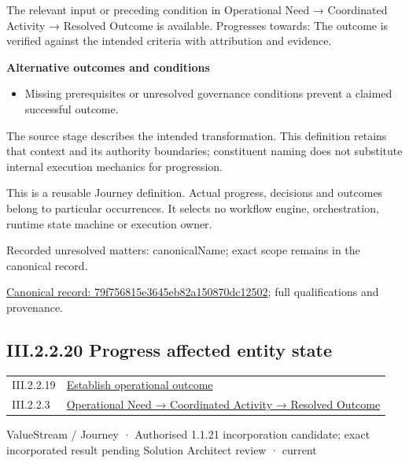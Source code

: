 The relevant input or preceding condition in Operational Need → Coordinated Activity → Resolved Outcome is available. Progresses towards: The outcome is verified against the intended criteria with attribution and evidence.



\par\medskip\textbf{Alternative outcomes and conditions}\par


\begin{itemize}


\item Missing prerequisites or unresolved governance conditions prevent a claimed successful outcome.

\end{itemize}


The source stage describes the intended transformation. This definition retains that context and its authority boundaries; constituent naming does not substitute internal execution mechanics for progression.



This is a reusable Journey definition. Actual progress, decisions and outcomes belong to particular occurrences. It selects no workflow engine, orchestration, runtime state machine or execution owner.


{\small Recorded unresolved matters: canonicalName; exact scope remains in the canonical record.}\par
{\footnotesize \href{../../../../../../../continuum/strategy/value-stream/79f756815e3645eb82a150870dc12502.md}{Canonical record: 79f756815e3645eb82a150870dc12502}; full qualifications and provenance.}\par
\subsection*{III.2.2.20 Progress affected entity state}
\label{navigation:III.2.2.20}

\begin{longtable}{p{.22\linewidth}p{.73\linewidth}}
III.2.2.19 & \hyperref[element:79f756815e3645eb82a150870dc12502]{Establish operational outcome} \\
III.2.2.3 & \hyperref[element:beea615ca7b34bbcbd0ad3a2a6ab2cff]{Operational Need → Coordinated Activity → Resolved Outcome} \\
\end{longtable}
\label{element:57880d06fd0b47d2a19d695afd7d48fc}
{\small ValueStream / Journey · Authorised 1.1.21 incorporation candidate; exact incorporated result pending Solution Architect review · current}\par


